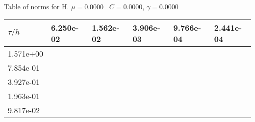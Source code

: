 \begin{center}
Table of norms for H. $\mu = 0.0000$ \, $C = 0.0000$, $\gamma = 0.0000$
  
\begin{tabular}{|p{1in}|p{1in}|p{1in}|p{1in}|p{1in}|p{1in}|} \hline
$\tau / h$ &6.250e-02 &1.562e-02 &3.906e-03 &9.766e-04 &2.441e-04 \\ \hline 
1.571e+00 & & & & & \\ \hline 
7.854e-01 & & & & & \\ \hline 
3.927e-01 & & & & & \\ \hline 
1.963e-01 & & & & & \\ \hline 
9.817e-02 & & & & & \\ \hline 

\end{tabular}\\[20pt]
\end{center}
